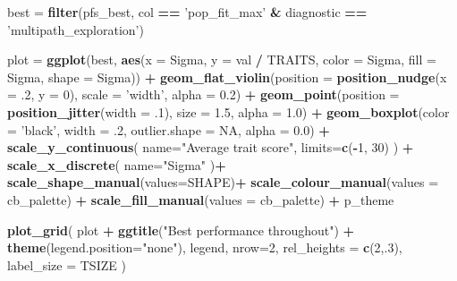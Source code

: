 \documentclass[]{book}
\newenvironment{Shaded}{\begin{snugshade}}{\end{snugshade}}
\newcommand{\DataTypeTok}[1]{\textcolor[rgb]{0.13,0.29,0.53}{#1}}
\newcommand{\DecValTok}[1]{\textcolor[rgb]{0.00,0.00,0.81}{#1}}
\newcommand{\FloatTok}[1]{\textcolor[rgb]{0.00,0.00,0.81}{#1}}
\newcommand{\KeywordTok}[1]{\textcolor[rgb]{0.13,0.29,0.53}{\textbf{#1}}}
\newcommand{\NormalTok}[1]{#1}
\newcommand{\OperatorTok}[1]{\textcolor[rgb]{0.81,0.36,0.00}{\textbf{#1}}}
\newcommand{\OtherTok}[1]{\textcolor[rgb]{0.56,0.35,0.01}{#1}}
\newcommand{\StringTok}[1]{\textcolor[rgb]{0.31,0.60,0.02}{#1}}
\begin{document}
\begin{Shaded}
\begin{Highlighting}[]
\NormalTok{best =}\StringTok{ }\KeywordTok{filter}\NormalTok{(pfs_best, col }\OperatorTok{==}\StringTok{ 'pop_fit_max'} \OperatorTok{&}\StringTok{ }\NormalTok{diagnostic }\OperatorTok{==}\StringTok{ 'multipath_exploration'}\NormalTok{)}

\NormalTok{plot =}\StringTok{ }\KeywordTok{ggplot}\NormalTok{(best, }\KeywordTok{aes}\NormalTok{(}\DataTypeTok{x =}\NormalTok{ Sigma, }\DataTypeTok{y =}\NormalTok{ val }\OperatorTok{/}\StringTok{ }\NormalTok{TRAITS, }\DataTypeTok{color =}\NormalTok{ Sigma, }\DataTypeTok{fill =}\NormalTok{ Sigma, }\DataTypeTok{shape =}\NormalTok{ Sigma)) }\OperatorTok{+}
\StringTok{  }\KeywordTok{geom_flat_violin}\NormalTok{(}\DataTypeTok{position =} \KeywordTok{position_nudge}\NormalTok{(}\DataTypeTok{x =} \FloatTok{.2}\NormalTok{, }\DataTypeTok{y =} \DecValTok{0}\NormalTok{), }\DataTypeTok{scale =} \StringTok{'width'}\NormalTok{, }\DataTypeTok{alpha =} \FloatTok{0.2}\NormalTok{) }\OperatorTok{+}
\StringTok{  }\KeywordTok{geom_point}\NormalTok{(}\DataTypeTok{position =} \KeywordTok{position_jitter}\NormalTok{(}\DataTypeTok{width =} \FloatTok{.1}\NormalTok{), }\DataTypeTok{size =} \FloatTok{1.5}\NormalTok{, }\DataTypeTok{alpha =} \FloatTok{1.0}\NormalTok{) }\OperatorTok{+}
\StringTok{  }\KeywordTok{geom_boxplot}\NormalTok{(}\DataTypeTok{color =} \StringTok{'black'}\NormalTok{, }\DataTypeTok{width =} \FloatTok{.2}\NormalTok{, }\DataTypeTok{outlier.shape =} \OtherTok{NA}\NormalTok{, }\DataTypeTok{alpha =} \FloatTok{0.0}\NormalTok{) }\OperatorTok{+}
\StringTok{  }\KeywordTok{scale_y_continuous}\NormalTok{(}
    \DataTypeTok{name=}\StringTok{"Average trait score"}\NormalTok{,}
    \DataTypeTok{limits=}\KeywordTok{c}\NormalTok{(}\OperatorTok{-}\DecValTok{1}\NormalTok{, }\DecValTok{30}\NormalTok{)}
\NormalTok{  ) }\OperatorTok{+}
\StringTok{  }\KeywordTok{scale_x_discrete}\NormalTok{(}
    \DataTypeTok{name=}\StringTok{"Sigma"}
\NormalTok{  )}\OperatorTok{+}
\StringTok{  }\KeywordTok{scale_shape_manual}\NormalTok{(}\DataTypeTok{values=}\NormalTok{SHAPE)}\OperatorTok{+}
\StringTok{  }\KeywordTok{scale_colour_manual}\NormalTok{(}\DataTypeTok{values =}\NormalTok{ cb_palette) }\OperatorTok{+}
\StringTok{  }\KeywordTok{scale_fill_manual}\NormalTok{(}\DataTypeTok{values =}\NormalTok{ cb_palette) }\OperatorTok{+}
\StringTok{  }\NormalTok{p_theme}

\KeywordTok{plot_grid}\NormalTok{(}
\NormalTok{  plot }\OperatorTok{+}
\StringTok{    }\KeywordTok{ggtitle}\NormalTok{(}\StringTok{"Best performance throughout"}\NormalTok{) }\OperatorTok{+}
\StringTok{    }\KeywordTok{theme}\NormalTok{(}\DataTypeTok{legend.position=}\StringTok{"none"}\NormalTok{),}
\NormalTok{  legend,}
  \DataTypeTok{nrow=}\DecValTok{2}\NormalTok{,}
  \DataTypeTok{rel_heights =} \KeywordTok{c}\NormalTok{(}\DecValTok{2}\NormalTok{,.}\DecValTok{3}\NormalTok{),}
  \DataTypeTok{label_size =}\NormalTok{ TSIZE}
\NormalTok{)}
\end{Highlighting}
\end{Shaded}
\end{document}
